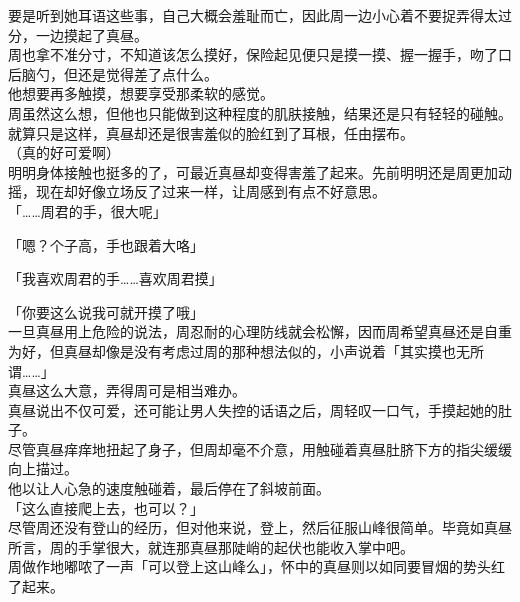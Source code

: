 要是听到她耳语这些事，自己大概会羞耻而亡，因此周一边小心着不要捉弄得太过分，一边摸起了真昼。\\

周也拿不准分寸，不知道该怎么摸好，保险起见便只是摸一摸、握一握手，吻了口后脑勺，但还是觉得差了点什么。\\

他想要再多触摸，想要享受那柔软的感觉。\\

周虽然这么想，但他也只能做到这种程度的肌肤接触，结果还是只有轻轻的碰触。\\

就算只是这样，真昼却还是很害羞似的脸红到了耳根，任由摆布。\\

（真的好可爱啊）\\

明明身体接触也挺多的了，可最近真昼却变得害羞了起来。先前明明还是周更加动摇，现在却好像立场反了过来一样，让周感到有点不好意思。\\

「……周君的手，很大呢」

「嗯？个子高，手也跟着大咯」

「我喜欢周君的手……喜欢周君摸」

「你要这么说我可就开摸了哦」\\

一旦真昼用上危险的说法，周忍耐的心理防线就会松懈，因而周希望真昼还是自重为好，但真昼却像是没有考虑过周的那种想法似的，小声说着「其实摸也无所谓……」\\

真昼这么大意，弄得周可是相当难办。\\

真昼说出不仅可爱，还可能让男人失控的话语之后，周轻叹一口气，手摸起她的肚子。\\

尽管真昼痒痒地扭起了身子，但周却毫不介意，用触碰着真昼肚脐下方的指尖缓缓向上描过。\\

他以让人心急的速度触碰着，最后停在了斜坡前面。\\

「这么直接爬上去，也可以？」\\

尽管周还没有登山的经历，但对他来说，登上，然后征服山峰很简单。毕竟如真昼所言，周的手掌很大，就连那真昼那陡峭的起伏也能收入掌中吧。\\

周做作地嘟哝了一声「可以登上这山峰么」，怀中的真昼则以如同要冒烟的势头红了起来。

